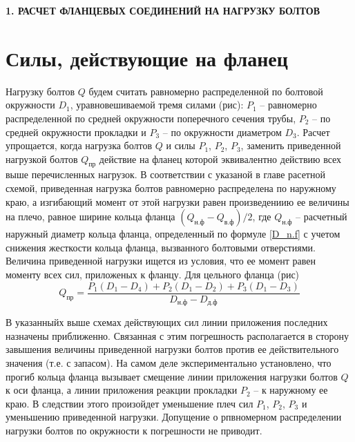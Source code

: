\newpage
\begin{center}
  \textbf{\large 1. РАСЧЕТ ФЛАНЦЕВЫХ СОЕДИНЕНИЙ НА НАГРУЗКУ БОЛТОВ}
\end{center}


\section{Силы, действующие на фланец}
\label{FlangeBoltTension}

Нагрузку болтов $Q$ будем считать равномерно распределенной по болтовой окружности $D_1$, уравновешиваемой тремя силами (рис): $P_1$ -- равномерно распределенной по средней окружности поперечного сечения трубы, $P_2$ -- по средней окружности прокладки и $P_3$ -- по окружности диаметром $D_3$.
Расчет упрощается, когда нагрузка болтов $Q$ и силы $P_1$, $P_2$, $P_3$, заменить приведенной нагрузкой болтов $Q_{\text{пр}}$ действие на фланец которой эквивалентно действию всех выше перечисленных нагрузок.
В соответствии с указаной в главе расетной схемой, приведенная нагрузка болтов равномерно распределена по наружному краю, а изгибающий момент от этой нагрузки равен произведениию ее величины на плечо, равное ширине кольца фланца $\left(Q_{\text{н.ф}}-Q_{\text{в.ф}}\right)/2$, где $Q_{\text{н.ф}}$ -- расчетный наружный диаметр кольца фланца, определенный по формуле \eqref{D_n.f} с учетом снижения жесткости кольца фланца, вызванного болтовыми отверстиями.
Величина приведенной нагрузки ищется из условия, что ее момент равен моменту всех сил, приложеных к фланцу.
Для цельного фланца (рис) 
\begin{equation}
  Q_{\text{пр}}=\frac{P_1 \left(D_1-D_4\right)+P_2 \left(D_1-D_2\right)+P_3 \left(D_1-D_3\right)}{D_{\text{н.ф}}-D_{\text{д.ф}}}
  \label{FlangeBoltTension_eq1}
\end{equation}

В указанныйх выше схемах действующих сил линии приложения последних назначены приближенно.
Связанная с этим погрешность располагается в сторону завышения величины приведенной нагрузки болтов против ее действительного значения (т.е. с запасом).
На самом деле экспериментально установлено, что прогиб кольца фланца вызывает смещение линии приложения нагрузки болтов $Q$ к оси фланца, а линии приложения реакции прокладки $P_2$ -- к наружному ее краю.
В следствии этого произойдет уменьшение плеч сил $P_1$, $P_2$, $P_3$ и уменьшению приведенной нагрузки.
Допущение о рпвномерном распределении нагрузки болтов по окружности к погрешности не приводит.

